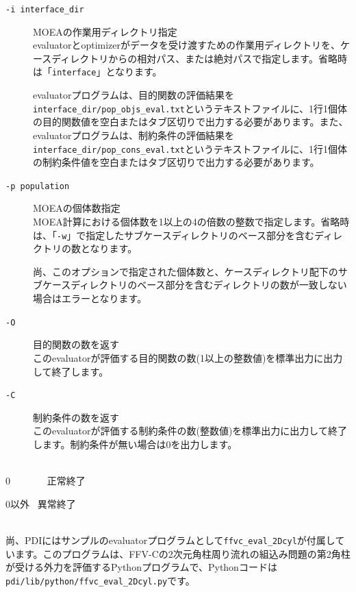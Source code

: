 \documentclass[a4paper,11pt]{jarticle}
\begin{document}
{\begin{description}
\begin{description}
\item[{\tt -i  interface\_dir}] MOEAの作業用ディレクトリ指定\\
evaluatorとoptimizerがデータを受け渡すための作業用ディレクトリを、ケースディレクトリからの相対パス、または絶対パスで指定します。省略時は「{\tt interface}」となります。

evaluatorプログラムは、目的関数の評価結果を{\tt interface\_dir/pop\_objs\_eval.txt}というテキストファイルに、1行1個体の目的関数値を空白またはタブ区切りで出力する必要があります。また、evaluatorプログラムは、制約条件の評価結果を{\tt interface\_dir/pop\_cons\_eval.txt}というテキストファイルに、1行1個体の制約条件値を空白またはタブ区切りで出力する必要があります。\\

\item[{\tt -p  population}] MOEAの個体数指定\\
MOEA計算における個体数を1以上の4の倍数の整数で指定します。省略時は、「{\tt -w}」で指定したサブケースディレクトリのベース部分を含むディレクトリの数となります。

尚、このオプションで指定された個体数と、ケースディレクトリ配下のサブケースディレクトリのベース部分を含むディレクトリの数が一致しない場合はエラーとなります。\\

\item[{\tt -O}] 目的関数の数を返す\\
このevaluatorが評価する目的関数の数(1以上の整数値)を標準出力に出力して終了します。\\

\item[{\tt -C}] 制約条件の数を返す\\
このevaluatorが評価する制約条件の数(整数値)を標準出力に出力して終了します。制約条件が無い場合は0を出力します。\\

\end{description}


\item[戻り値(終了ステータス)] {\ }\\
0 \ \ \ \ \ \ \ 正常終了

0以外 \ 異常終了
\end{description}
 {\ }\\

尚、PDIにはサンプルのevaluatorプログラムとして{\tt ffvc\_eval\_2Dcyl}が付属しています。このプログラムは、FFV-Cの2次元角柱周り流れの組込み問題の第2角柱が受ける外力を評価するPythonプログラムで、Pythonコードは{\tt pdi/lib/python/ffvc\_eval\_2Dcyl.py}です。


}
\end{document}
